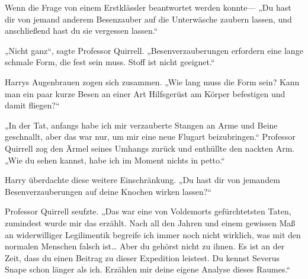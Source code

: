 Wenn die Frage von einem Erstklässler beantwortet werden konnte—
„Du hast dir von jemand anderem Besenzauber auf die Unterwäsche zaubern lassen, und anschließend hast du sie vergessen lassen.“

„Nicht ganz“, sagte Professor Quirrell. „Besenverzauberungen erfordern eine lange schmale Form, die fest sein muss. Stoff ist nicht geeignet.“

Harrys Augenbrauen zogen sich zusammen.
„Wie lang muss die Form sein? Kann man ein paar kurze Besen an einer Art Hilfsgerüst am Körper befestigen und damit fliegen?“

„In der Tat, anfangs habe ich mir verzauberte Stangen an Arme und Beine geschnallt, aber das war nur, um mir eine neue Flugart beizubringen.“
Professor Quirrell zog den Ärmel seines Umhangs zurück und enthüllte den nackten Arm.
„Wie du sehen kannst, habe ich im Moment nichts in petto.“

Harry überdachte diese weitere Einschränkung.
„Du hast dir von jemandem Besenverzauberungen auf deine Knochen wirken lassen?“

Professor Quirrell seufzte.
„Das war eine von Voldemorts gefürchtetsten Taten, zumindest wurde mir das erzählt. Nach all den Jahren und einem gewissen Maß an widerwilliger Legilimentik begreife ich immer noch nicht wirklich, was mit den normalen Menschen falsch ist… Aber du gehörst nicht zu ihnen. Es ist an der Zeit, dass du einen Beitrag zu dieser Expedition leistest. Du kennst Severus Snape schon länger als ich. Erzählen mir deine eigene Analyse dieses Raumes.“

